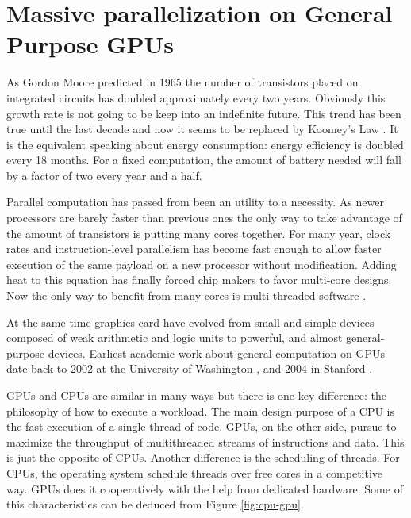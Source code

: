 \documentclass{article}
\begin{document}
\section{Massive parallelization on General Purpose GPUs}
\label{sec:parall_and_GPUs}

As Gordon Moore predicted in 1965 the number of transistors placed on
integrated circuits has doubled approximately every two years. %
Obviously this growth rate is not going to be keep into an indefinite future. This trend has been true until the last decade and now it seems to be replaced by Koomey's Law \cite{10.1109/MAHC.2010.28}. It is the equivalent speaking about energy consumption: energy efficiency is doubled every 18 months. For a fixed computation, the amount of battery needed will fall by a factor of two every year and a half.

Parallel computation has passed from been an utility to a
necessity. As newer processors are barely faster than previous ones 
the only way to take advantage of the amount of transistors is putting
many cores together. For many year, clock rates and instruction-level
parallelism has become fast enough to allow faster execution of the
same payload on a new processor without modification. Adding heat to
this equation has finally forced chip makers to favor multi-core
designs. Now the only way to benefit from many cores is multi-threaded
software \cite{6307773}. 

At the same time graphics card have evolved from small and simple
devices composed of weak arithmetic and logic units to powerful, and
almost general-purpose devices. Earliest academic work about general
computation on GPUs date back to 2002 at the University of Washington
\cite{Thompson:2002:UMG:774861.774894}, and 2004 in Stanford
\cite{Buck:2004:BGS:1015706.1015800}. %

GPUs and CPUs are similar in many ways but there is one key
difference: the philosophy of how to execute a workload. The main
design purpose of a CPU is the fast execution of a single thread of
code. GPUs, on the other side, pursue to maximize the throughput of
multithreaded streams of instructions and data. This is just the
opposite of CPUs. Another difference is the scheduling of threads. For
CPUs, the operating system schedule threads over free cores in a
competitive way. GPUs does it cooperatively with the help from
dedicated hardware. Some of this characteristics can be deduced from
Figure \ref{fig:cpu-gpu}. 
\end{document}

